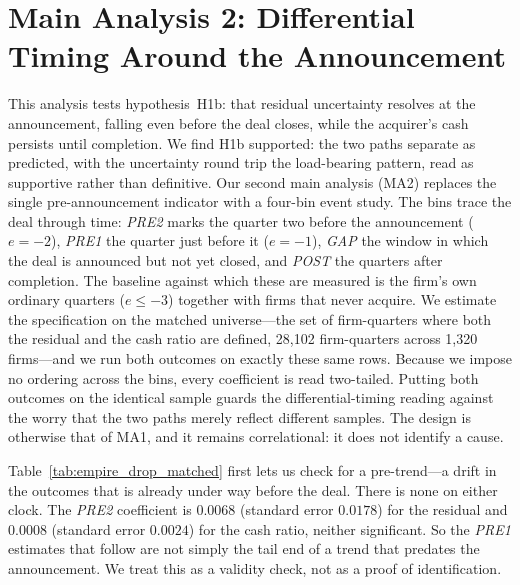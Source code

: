 \section{Main Analysis 2: Differential Timing Around the Announcement}

This analysis tests hypothesis~H1b: that residual uncertainty resolves at the announcement, falling even before the deal closes, while the acquirer's cash persists until completion. We find H1b supported: the two paths separate as predicted, with the uncertainty round trip the load-bearing pattern, read as supportive rather than definitive. Our second main analysis (MA2) replaces the single pre-announcement indicator with a four-bin event study. The bins trace the deal through time: \textit{PRE2} marks the quarter two before the announcement ($e=-2$), \textit{PRE1} the quarter just before it ($e=-1$), \textit{GAP} the window in which the deal is announced but not yet closed, and \textit{POST} the quarters after completion. The baseline against which these are measured is the firm's own ordinary quarters ($e\le-3$) together with firms that never acquire. We estimate the specification on the matched universe---the set of firm-quarters where both the residual and the cash ratio are defined, 28,102 firm-quarters across 1,320 firms---and we run both outcomes on exactly these same rows. Because we impose no ordering across the bins, every coefficient is read two-tailed. Putting both outcomes on the identical sample guards the differential-timing reading against the worry that the two paths merely reflect different samples. The design is otherwise that of MA1, and it remains correlational: it does not identify a cause.

Table~\ref{tab:empire_drop_matched} first lets us check for a pre-trend---a drift in the outcomes that is already under way before the deal. There is none on either clock. The \textit{PRE2} coefficient is $0.0068$ (standard error $0.0178$) for the residual and $0.0008$ (standard error $0.0024$) for the cash ratio, neither significant. So the \textit{PRE1} estimates that follow are not simply the tail end of a trend that predates the announcement. We treat this as a validity check, not as a proof of identification.

